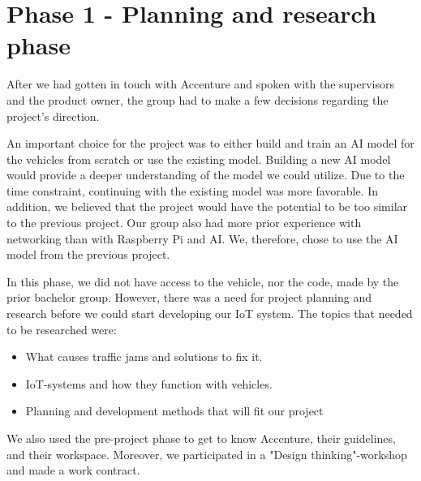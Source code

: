 \section{Phase 1 - Planning and research phase}\label{sec:phase1}

After we had gotten in touch with Accenture and spoken with the supervisors and the product owner, the group had to make a few decisions regarding the project's direction.

An important choice for the project was to either build and train an AI model for the vehicles from scratch or use the existing model. Building a new AI model would provide a deeper understanding of the model we could utilize. Due to the time constraint, continuing with the existing model was more favorable. In addition, we believed that the project would have the potential to be too similar to the previous project.  Our group also had more prior experience with networking than with Raspberry Pi and AI. We, therefore, chose to use the AI model from the previous project. 

In this phase, we did not have access to the vehicle, nor the code, made by the prior bachelor group. However, there was a need for project planning and research before we could start developing our IoT system. The topics that needed to be researched were:

\begin{itemize}
\item What causes traffic jams and solutions to fix it.
\item IoT-systems and how they function with vehicles.
\item Planning and development methods that will fit our project
\end{itemize}

We also used the pre-project phase to get to know Accenture, their guidelines, and their workspace. Moreover, we participated in a "Design thinking"-workshop and made a work contract. 











\clearpage